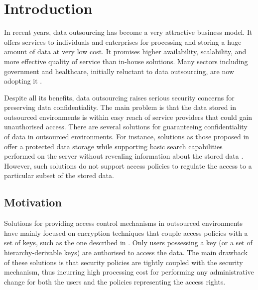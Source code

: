 \documentclass[epsfig,a4paper,11pt,titlepage]{book}
\numberwithin{algorithm}{chapter}
\begin{document}
\section{Introduction}

In recent years, data outsourcing has become a very attractive business model. It offers services to individuals and enterprises for processing and storing a huge amount of data at very low cost. It promises higher availability, scalability, and more effective quality of service than in-house solutions. Many sectors including government and healthcare, initially reluctant to data outsourcing, are now adopting it \cite{Ondo:2006}.

Despite all its benefits, data outsourcing raises serious security concerns for preserving data confidentiality. The main problem is that the data stored in outsourced environments is within easy reach of service providers that could gain unauthorised access. There are several solutions for guaranteeing confidentiality of data in outsourced environments. For instance, solutions as those proposed in \cite{Dong:2011, Kamara:2010} offer a protected data storage while supporting basic search capabilities performed on the server without revealing information about the stored data \cite{Hore:2012, Kamara:2012, Bosch:2011, Cao:2011, Li:2011, Yang:2011, Zhu:2011, Li:2010, Wang:2010, Yang:2009}. However, such solutions do not support access policies to regulate the access to a particular subset of the stored data.

\subsection{Motivation}
Solutions for providing access control mechanisms in outsourced environments have mainly focused on encryption techniques that couple access policies with a set of keys, such as the one described in \cite{Vimercati:2008, Vimercati:2010}. Only users possessing a key (or a set of hierarchy-derivable keys) are authorised to access the data. The main drawback of these solutions is that security policies are tightly coupled with the security mechanism, thus incurring high processing cost for performing any administrative change for both the users and the policies representing the access rights.
\end{document}
